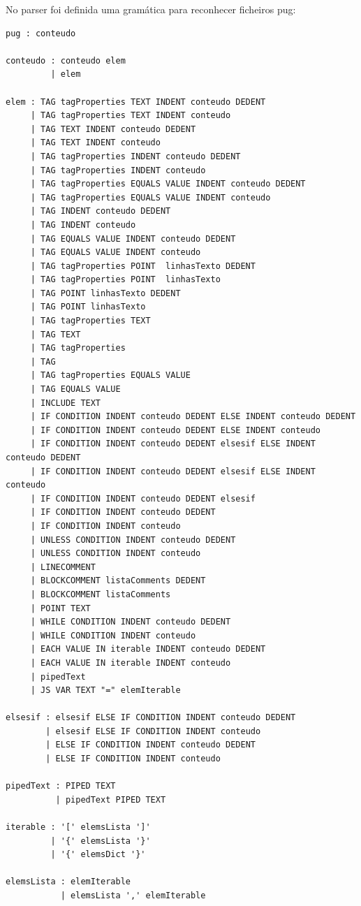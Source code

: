 \documentclass[11pt,a4paper]{report}%
\begin{document}
No parser foi definida uma gramática para reconhecer ficheiros pug:
\begin{verbatim}
pug : conteudo

conteudo : conteudo elem
         | elem
         
elem : TAG tagProperties TEXT INDENT conteudo DEDENT
     | TAG tagProperties TEXT INDENT conteudo
     | TAG TEXT INDENT conteudo DEDENT
     | TAG TEXT INDENT conteudo
     | TAG tagProperties INDENT conteudo DEDENT
     | TAG tagProperties INDENT conteudo
     | TAG tagProperties EQUALS VALUE INDENT conteudo DEDENT
     | TAG tagProperties EQUALS VALUE INDENT conteudo
     | TAG INDENT conteudo DEDENT
     | TAG INDENT conteudo
     | TAG EQUALS VALUE INDENT conteudo DEDENT
     | TAG EQUALS VALUE INDENT conteudo
     | TAG tagProperties POINT  linhasTexto DEDENT
     | TAG tagProperties POINT  linhasTexto
     | TAG POINT linhasTexto DEDENT
     | TAG POINT linhasTexto
     | TAG tagProperties TEXT
     | TAG TEXT
     | TAG tagProperties
     | TAG
     | TAG tagProperties EQUALS VALUE
     | TAG EQUALS VALUE
     | INCLUDE TEXT
     | IF CONDITION INDENT conteudo DEDENT ELSE INDENT conteudo DEDENT
     | IF CONDITION INDENT conteudo DEDENT ELSE INDENT conteudo 
     | IF CONDITION INDENT conteudo DEDENT elsesif ELSE INDENT conteudo DEDENT
     | IF CONDITION INDENT conteudo DEDENT elsesif ELSE INDENT conteudo
     | IF CONDITION INDENT conteudo DEDENT elsesif
     | IF CONDITION INDENT conteudo DEDENT
     | IF CONDITION INDENT conteudo
     | UNLESS CONDITION INDENT conteudo DEDENT 
     | UNLESS CONDITION INDENT conteudo 
     | LINECOMMENT
     | BLOCKCOMMENT listaComments DEDENT
     | BLOCKCOMMENT listaComments
     | POINT TEXT
     | WHILE CONDITION INDENT conteudo DEDENT
     | WHILE CONDITION INDENT conteudo 
     | EACH VALUE IN iterable INDENT conteudo DEDENT
     | EACH VALUE IN iterable INDENT conteudo 
     | pipedText
     | JS VAR TEXT "=" elemIterable
     
elsesif : elsesif ELSE IF CONDITION INDENT conteudo DEDENT
        | elsesif ELSE IF CONDITION INDENT conteudo
        | ELSE IF CONDITION INDENT conteudo DEDENT
        | ELSE IF CONDITION INDENT conteudo
        
pipedText : PIPED TEXT
          | pipedText PIPED TEXT
          
iterable : '[' elemsLista ']'
         | '{' elemsLista '}'
         | '{' elemsDict '}'
         
elemsLista : elemIterable
           | elemsLista ',' elemIterable 
           

\end{verbatim}
\end{document}
